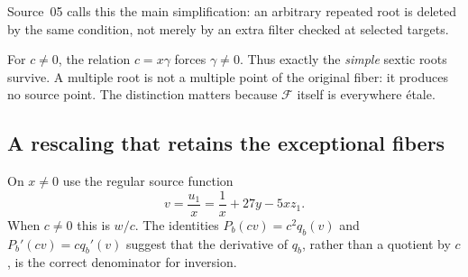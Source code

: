 \documentclass[11pt,a4paper]{article}
\theoremstyle{definition}
\newcommand{\F}{\mathcal F}
\begin{document}
Source~05 calls this the main simplification: an arbitrary repeated root is
deleted by the same condition, not merely by an extra filter checked at
selected targets.

For $c\ne0$, the relation $c=x\gamma$ forces $\gamma\ne0$.
Thus exactly the \emph{simple} sextic roots survive. A multiple root is
not a multiple point of the original fiber: it produces no source point.
The distinction matters because $\F$ itself is everywhere \'etale.

\subsection{A rescaling that retains the exceptional fibers}
On $x\ne0$ use the regular source function
\begin{equation}\label{f6:eq:vforward}
 v=\frac{u_1}{x}=\frac1x+27y-5xz_1.
\end{equation}
When $c\ne0$ this is $w/c$. The identities $P_b(cv)=c^2q_b(v)$ and
$P_b'(cv)=cq_b'(v)$ suggest that the derivative of $q_b$, rather than
a quotient by $c$, is the correct denominator for inversion.
\end{document}
